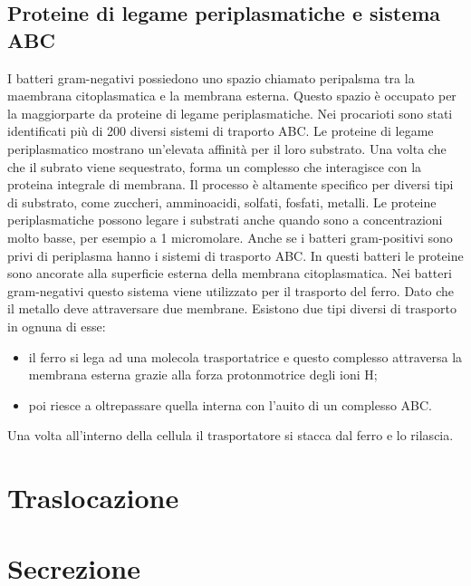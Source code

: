 \subsection{Proteine di legame periplasmatiche e sistema ABC}
I batteri gram-negativi possiedono uno spazio chiamato peripalsma tra la maembrana citoplasmatica e la membrana esterna. Questo spazio \`e occupato per la maggiorparte da proteine di legame periplasmatiche. 
Nei procarioti sono stati identificati pi\`u di 200 diversi sistemi di traporto ABC. Le proteine di legame periplasmatico mostrano un'elevata affinit\`a per il loro substrato. Una volta che che il subrato viene sequestrato, forma un complesso che interagisce con la proteina integrale di membrana. Il processo \`e altamente specifico per diversi tipi di substrato, come zuccheri, amminoacidi, solfati, fosfati, metalli. Le proteine periplasmatiche possono legare i substrati anche quando sono a concentrazioni molto basse, per esempio a 1 micromolare.
Anche se i batteri gram-positivi sono privi di periplasma hanno i sistemi di trasporto ABC. In questi batteri le proteine sono ancorate alla superficie esterna della membrana citoplasmatica. 
Nei batteri gram-negativi questo sistema viene utilizzato per il trasporto del ferro. Dato che il metallo deve attraversare due membrane. Esistono due tipi diversi di trasporto in ognuna di esse: 
\begin{itemize}
    \item il ferro si lega ad una molecola trasportatrice e questo complesso attraversa la membrana esterna grazie alla forza protonmotrice degli ioni H\ap{+};
    \item poi riesce a oltrepassare quella interna con l'auito di un complesso ABC. 
\end{itemize}
Una volta all'interno della cellula il trasportatore si stacca dal ferro e lo rilascia. 
\section{Traslocazione}
\section{Secrezione}
